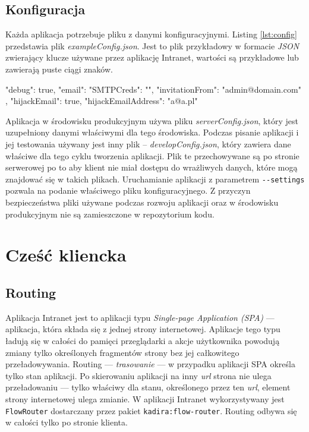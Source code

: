   \subsection{Konfiguracja}
Każda aplikacja potrzebuje pliku z danymi konfiguracyjnymi. Listing \ref{lst:config} przedstawia plik \textit{exampleConfig.json}. Jest to plik przykładowy w formacie \textit{JSON} zwierający klucze używane przez aplikację Intranet, wartości są przykładowe lub zawierają puste ciągi znaków.
\begin{js}[caption={{Przykładowa konfiguracja - \textit{exampleConfig.json}}},label={lst:config}]
{
  "debug": true,
  "email": {
    "SMTPCreds": "",
    "invitationFrom": "admin@domain.com"
  },
  "hijackEmail": true,
  "hijackEmailAddress": "a@a.pl"
}
\end{js}
Aplikacja w środowisku produkcyjnym używa pliku \textit{serverConfig.json}, który jest uzupełniony danymi właściwymi dla tego środowiska. Podczas pisanie aplikacji i jej testowania używany jest inny plik -- \textit{developConfig.json}, który zawiera dane właściwe dla tego cyklu tworzenia aplikacji. Plik te przechowywane są po stronie serwerowej po to aby klient nie miał dostępu do wrażliwych danych, które mogą znajdować się w takich plikach. Uruchamianie aplikacji z parametrem \verb|--settings| pozwala na podanie właściwego pliku konfiguracyjnego. Z przyczyn bezpieczeństwa pliki używane podczas rozwoju aplikacji oraz w środowisku produkcyjnym nie są zamieszczone w repozytorium kodu.

\section{Cześć kliencka}
  \subsection{Routing}
Aplikacja Intranet jest to aplikacji typu \textit{Single-page Application (SPA)} --- aplikacja, która składa się z jednej strony internetowej. Aplikacje tego typu ładują się w całości do pamięci przeglądarki a akcje użytkownika powodują zmiany tylko określonych fragmentów strony bez jej całkowitego przeładowywania. Routing --- \textit{trasowanie} --- w przypadku aplikacji SPA określa tylko stan aplikacji. Po skierowaniu aplikacji na inny \textit{url} strona nie ulega przeładowaniu --- tylko właściwy dla stanu, określonego przez ten \textit{url}, element strony internetowej ulega zmianie. W aplikacji Intranet wykorzystywany jest \verb|FlowRouter| dostarczany przez pakiet \verb|kadira:flow-router|. Routing odbywa się w całości tylko po stronie klienta. 

